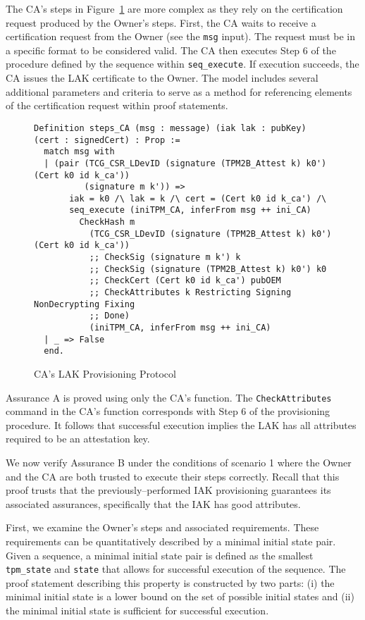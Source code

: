 \documentclass[runningheads]{llncs}
\begin{document}
The CA's steps in Figure~\ref{fig:lak_model_CA} are more complex as
they rely on the certification request produced by the Owner's
steps. First, the CA waits to receive a certification request from the
Owner (see the \verb|msg| input). The request must be in a specific
format to be considered valid. The CA then executes Step 6 of the
procedure defined by the sequence within \verb|seq_execute|. If
execution succeeds, the CA issues the LAK certificate to the Owner.
The model includes several additional parameters and criteria to serve
as a method for referencing elements of the certification request
within proof statements.

\begin{figure}[hpbt]
\begin{lstlisting}[language=Coq]
Definition steps_CA (msg : message) (iak lak : pubKey) (cert : signedCert) : Prop :=
  match msg with
  | (pair (TCG_CSR_LDevID (signature (TPM2B_Attest k) k0') (Cert k0 id k_ca'))
          (signature m k')) =>
       iak = k0 /\ lak = k /\ cert = (Cert k0 id k_ca') /\
       seq_execute (iniTPM_CA, inferFrom msg ++ ini_CA)
         CheckHash m
           (TCG_CSR_LDevID (signature (TPM2B_Attest k) k0') (Cert k0 id k_ca'))
           ;; CheckSig (signature m k') k
           ;; CheckSig (signature (TPM2B_Attest k) k0') k0
           ;; CheckCert (Cert k0 id k_ca') pubOEM
           ;; CheckAttributes k Restricting Signing NonDecrypting Fixing
           ;; Done)
           (iniTPM_CA, inferFrom msg ++ ini_CA)
  | _ => False
  end.
\end{lstlisting}
\caption{CA's LAK Provisioning Protocol}
\label{fig:lak_model_CA}
\end{figure}

Assurance A is proved using only the CA's function. The
\verb|CheckAttributes| command in the CA's function corresponds with
Step 6 of the provisioning procedure.  It follows that successful
execution implies the LAK has all attributes required to be an
attestation key.

We now verify Assurance B under the conditions of scenario 1 where the
Owner and the CA are both trusted to execute their steps
correctly. Recall that this proof trusts that the
previously--performed IAK provisioning guarantees its
associated assurances, specifically that the IAK has good attributes.

First, we examine the Owner's steps and associated requirements. These
requirements can be quantitatively described by a minimal initial
state pair. Given a sequence, a minimal initial state pair is defined
as the smallest \verb|tpm_state| and \verb|state| that allows for
successful execution of the sequence. The proof statement describing
this property is constructed by two parts: (i) the minimal initial
state is a lower bound on the set of possible initial states and (ii)
the minimal initial state is sufficient for successful execution.
\end{document}
